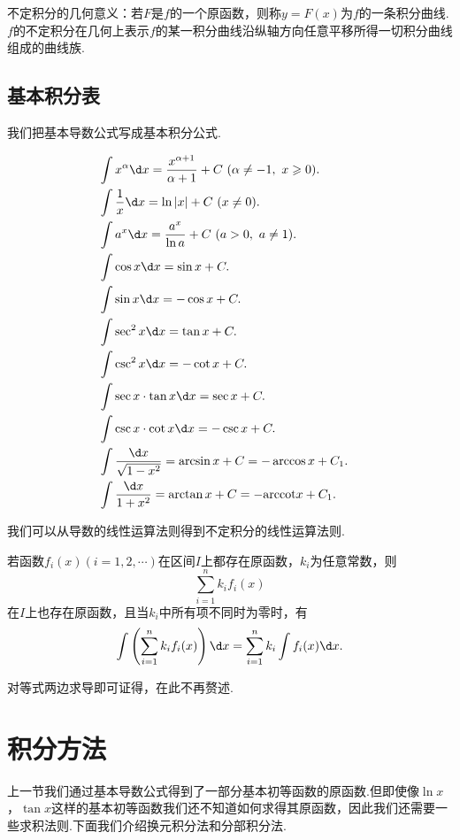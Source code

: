 不定积分的几何意义：若$F$是$f$的一个原函数，则称$y=F(x)$为$f$的一条{\heiti 积分曲线}.$f$的不定积分在几何上表示$f$的某一积分曲线沿纵轴方向任意平移所得一切积分曲线组成的曲线族.
\subsection{基本积分表}
我们把基本导数公式写成基本积分公式.
\begin{proposition}[基本积分公式]
	\begin{align*}
		&\int x^\alpha\d x=\frac{x^{\alpha +1}}{\alpha +1}+C\ (\alpha\neq -1,\ x\geqslant 0).\\
		&\int \frac{1}{x}\d x=\ln|x|+C\ (x\neq 0).\\
		&\int a^x\d x=\frac{a^x}{\ln a}+C\ (a>0,\ a\neq 1).\\
		&\int \cos x\d x=\sin x+C.\\
		&\int \sin x\d x=-\cos x+C.\\
		&\int \sec^2 x\d x=\tan x+C.\\
		&\int \csc^2 x\d x=-\cot x+C.\\
		&\int \sec x\cdot\tan x\d x=\sec x+C.\\
		&\int \csc x\cdot\cot x\d x=-\csc x+C.\\
		&\int \frac{\d x}{\sqrt{1-x^2}}=\arcsin x+C=-\arccos x+C_1.\\
		&\int \frac{\d x}{1+x^2}=\arctan x+C=-\text{arccot}x+C_1.&
	\end{align*}
\end{proposition}
我们可以从导数的线性运算法则得到不定积分的线性运算法则.
\begin{theorem}[积分的线性性]
	若函数$f_i(x)(i=1,2,\cdots)$在区间$I$上都存在原函数，$k_i$为任意常数，则
	$$\sum_{i=1}^{n}k_if_i(x)$$在$I$上也存在原函数，且当$k_i$中所有项不同时为零时，有
	$$\int\left(\sum_{i=1}^{n}k_if_i(x)\right)\d x=\sum_{i=1}^{n}k_i\int f_i(x)\d x.$$
\end{theorem}
对等式两边求导即可证得，在此不再赘述.
\section{积分方法}
上一节我们通过基本导数公式得到了一部分基本初等函数的原函数.但即使像$\ln x$，$\tan x$这样的基本初等函数我们还不知道如何求得其原函数，因此我们还需要一些求积法则.下面我们介绍换元积分法和分部积分法.
